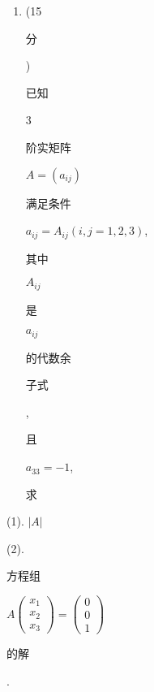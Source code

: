 \documentclass[10pt]{article}
\begin{document}
\begin{enumerate}
  \item (15 \begin{CJK}{UTF8}{mj}分\end{CJK}) \begin{CJK}{UTF8}{mj}已知\end{CJK} 3 \begin{CJK}{UTF8}{mj}阶实矩阵\end{CJK} $A=\left(a_{i j}\right)$ \begin{CJK}{UTF8}{mj}满足条件\end{CJK} $a_{i j}=A_{i j}(i, j=1,2,3)$, \begin{CJK}{UTF8}{mj}其中\end{CJK} $A_{i j}$ \begin{CJK}{UTF8}{mj}是\end{CJK} $a_{i j}$ \begin{CJK}{UTF8}{mj}的代数余\end{CJK} \begin{CJK}{UTF8}{mj}子式\end{CJK}, \begin{CJK}{UTF8}{mj}且\end{CJK} $a_{33}=-1$, \begin{CJK}{UTF8}{mj}求\end{CJK}

\end{enumerate}
(1). $|A|$

(2). \begin{CJK}{UTF8}{mj}方程组\end{CJK} $A\left(\begin{array}{l}x_{1} \\ x_{2} \\ x_{3}\end{array}\right)=\left(\begin{array}{l}0 \\ 0 \\ 1\end{array}\right)$ \begin{CJK}{UTF8}{mj}的解\end{CJK}.
\end{document}
